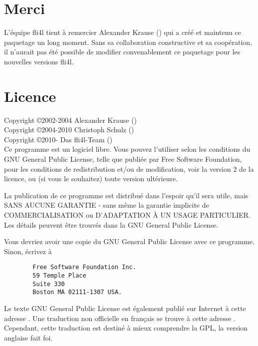 \section{Merci}

L'équipe fli4l tient à remercier Alexander Krause ()
qui a créé et maintenu ce paquetage un long moment. Sans sa collaboration
constructive et sa coopération, il n'aurait pas été possible de modifier
convenablement ce paquetage pour les nouvelles versions fli4l.

\section{Licence}

Copyright \copyright  2002-2004 Alexander Krause () \\
Copyright \copyright  2004-2010 Christoph Schulz () \\
Copyright \copyright  2010-     Das fli4l-Team () \\

Ce programme est un logiciel libre. Vous pouvez l'utiliser selon les conditions
du GNU General Public License, telle que publiée par Free Software Foundation,
pour les conditions de redistribution et/ou de modification, voir la version 2
de la licence, ou (si vous le souhaitez) toute version ultérieure.

La publication de ce programme est distribué dans l'espoir qu'il sera utile,
mais SANS AUCUNE GARANTIE - sans même la garantie implicite de COMMERCIALISATION
ou D'ADAPTATION À UN USAGE PARTICULIER. Les détails peuvent être trouvés dans
la GNU General Public License.

Vous devriez avoir une copie du GNU General Public License avec ce programme.
Sinon, écrivez à

\begin{verbatim}
		Free Software Foundation Inc.
		59 Temple Place
		Suite 330
		Boston MA 02111-1307 USA.
\end{verbatim}

Le texte GNU General Public License est également publié sur Internet
à cette adresse .
Une traduction non officielle en français se trouve à cette adresse
.
Cependant, cette traduction est destiné à mieux comprendre la GPL,
la version anglaise fait foi.

